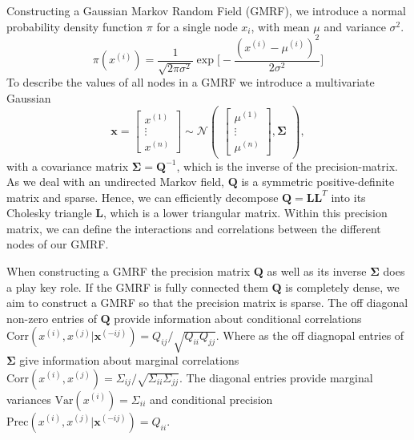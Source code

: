 Constructing a Gaussian Markov Random Field (GMRF), we introduce a normal probability density function $\pi$ for a single node $x_i$, with mean $\mu$ and variance $\sigma^2$.
\begin{equation}
    \pi(x^{(i)}) = \frac{1}{\sqrt{2 \pi \sigma^2}} \exp{\Bigg[ - \frac{( x^{(i)} - \mu^{(i)} )^2}{2 \sigma^2} \Bigg] }  %
\end{equation}
To describe the values of all nodes in a GMRF we introduce a multivariate Gaussian
\begin{equation}
    \bm{x} = \begin{bmatrix}
           x^{(1)} \\
           \vdots \\ 
           x^{(n)}
         \end{bmatrix} 
         \sim 
         \mathcal{N}\begin{pmatrix} 
         \begin{bmatrix}
           \mu^{(1)} \\
           \vdots \\ 
           \mu^{(n)}
         \end{bmatrix}
         ,
         \bm{\Sigma}
         \end{pmatrix},
\end{equation}
with a covariance matrix $\mathbf{\Sigma} = \bm{Q}^{-1}$, which is the inverse of the precision-matrix.
As we deal with an undirected Markov field, $\bm{Q}$ is a symmetric positive-definite matrix and sparse.
Hence, we can efficiently decompose $\bm{Q} = \mathbf{L} \mathbf{L}^T$ into its Cholesky triangle $\mathbf{L}$, which is a lower triangular matrix.
Within this precision matrix, we can define the interactions and correlations between the different nodes of our GMRF.


When constructing a GMRF the precision matrix $\bm{Q}$ as well as its inverse $\bm{\Sigma}$ does a play key role.
If the GMRF is fully connected them $\bm{Q}$ is completely dense, we aim to construct a GMRF so that the precision matrix is sparse.
The off diagonal non-zero entries of $\bm{Q}$ provide information about conditional correlations $\text{Corr}(x^{(i)}, x^{(j)} | \bm{x}^{(-ij)}) = Q_{ij} / \sqrt{Q_{ii} Q_{jj}}$.
Where as the off diagnopal entries of $\bm{\Sigma}$ give information about marginal correlations $\text{Corr}(x^{(i)}, x^{(j)}) = \Sigma_{ij} / \sqrt{\Sigma_{ii} \Sigma_{jj}}$.
The diagonal entries provide marginal variances $\text{Var}(x^{(i)}) = \Sigma_{ii}$ and conditional precision $\text{Prec}(x^{(i)},x^{(j)} | \bm{x}^{(-ij)}) =  Q_{ii}$.


